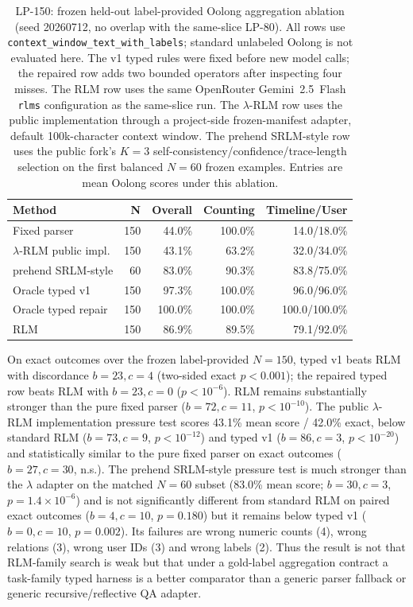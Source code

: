 \documentclass[letterpaper]{article}
\begin{document}
\begin{table}[!t]
\centering
\small
\setlength{\tabcolsep}{4pt}
\begin{tabular}{@{}lrrrr@{}}
\toprule
\textbf{Method} & \textbf{N} & \textbf{Overall} & \textbf{Counting} & \textbf{Timeline/User} \\
\midrule
Fixed parser & 150 & 44.0\% & 100.0\% & 14.0/18.0\% \\
$\lambda$-RLM public impl. & 150 & 43.1\% & 63.2\% & 32.0/34.0\% \\
prehend SRLM-style & 60 & 83.0\% & 90.3\% & 83.8/75.0\% \\
Oracle typed v1 & 150 & 97.3\% & 100.0\% & 96.0/96.0\% \\
Oracle typed repair & 150 & 100.0\% & 100.0\% & 100.0/100.0\% \\
RLM & 150 & 86.9\% & 89.5\% & 79.1/92.0\% \\
\bottomrule
\end{tabular}
\caption{LP-150: frozen held-out label-provided Oolong aggregation ablation (seed 20260712, no overlap with the same-slice LP-80). All rows use \texttt{context\_window\_text\_with\_labels}; standard unlabeled Oolong is not evaluated here. The v1 typed rules were fixed before new model calls; the repaired row adds two bounded operators after inspecting four misses. The RLM row uses the same OpenRouter Gemini~2.5~Flash \texttt{rlms} configuration as the same-slice run. The $\lambda$-RLM row uses the public implementation through a project-side frozen-manifest adapter, default 100k-character context window. The prehend SRLM-style row uses the public fork's $K=3$ self-consistency/confidence/trace-length selection on the first balanced $N=60$ frozen examples. Entries are mean Oolong scores under this ablation.}
\label{tab:supp-oolong-heldout}
\end{table}

On exact outcomes over the frozen label-provided $N=150$, typed v1 beats RLM with discordance $b=23,c=4$ (two-sided exact $p<0.001$); the repaired typed row beats RLM with $b=23,c=0$ ($p<10^{-6}$). RLM remains substantially stronger than the pure fixed parser ($b=72,c=11$, $p<10^{-10}$). The public $\lambda$-RLM implementation pressure test scores 43.1\% mean score / 42.0\% exact, below standard RLM ($b=73,c=9$, $p<10^{-12}$) and typed v1 ($b=86,c=3$, $p<10^{-20}$) and statistically similar to the pure fixed parser on exact outcomes ($b=27,c=30$, n.s.). The prehend SRLM-style pressure test is much stronger than the $\lambda$ adapter on the matched $N=60$ subset (83.0\% mean score; $b=30,c=3$, $p=1.4{\times}10^{-6}$) and is not significantly different from standard RLM on paired exact outcomes ($b=4,c=10$, $p=0.180$) but it remains below typed v1 ($b=0,c=10$, $p=0.002$). Its failures are wrong numeric counts (4), wrong relations (3), wrong user IDs (3) and wrong labels (2). Thus the result is not that RLM-family search is weak but that under a gold-label aggregation contract a task-family typed harness is a better comparator than a generic parser fallback or generic recursive/reflective QA adapter.
\end{document}
